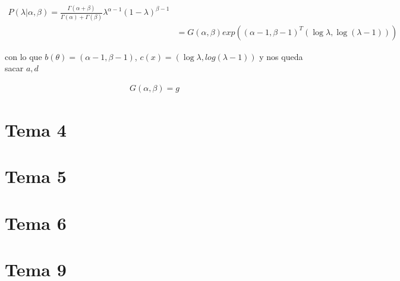 \documentclass[11pt]{article}
\begin{document}
\begin{align}
  P(\lambda|\alpha, \beta) = \frac{\Gamma(\alpha+\beta)}{\Gamma(\alpha) + \Gamma(\beta)} \lambda^{\alpha-1} (1-\lambda)^{\beta-1} \\
  &= G(\alpha,\beta) exp((\alpha-1,\beta-1)^T (\log \lambda, \log (\lambda-1)))
\end{align}

con lo que \(b(\theta) = (\alpha-1, \beta-1)\), \(c(x) = (\log \lambda,
log(\lambda-1))\) y nos queda sacar \(a, d\)

\begin{align}
	G(\alpha,\beta) = g
\end{align}

\section{Tema 4}
\label{sec:orgca2dca9}

\section{Tema 5}
\label{sec:org507f035}

\section{Tema 6}
\label{sec:org373cbd0}

\section{Tema 9}
\label{sec:org13ca834}
\end{document}

